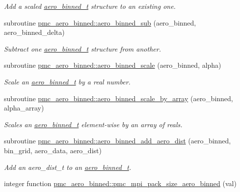 \begin{DoxyCompactItemize}
\begin{DoxyCompactList}\small\item\em Add a scaled {\ttfamily \mbox{\hyperlink{structpmc__aero__binned_1_1aero__binned__t}{aero\+\_\+binned\+\_\+t}}} structure to an existing one. \end{DoxyCompactList}\item 
subroutine \mbox{\hyperlink{namespacepmc__aero__binned_a951d4b411ac6e8389dff498a3fac4a75}{pmc\+\_\+aero\+\_\+binned\+::aero\+\_\+binned\+\_\+sub}} (aero\+\_\+binned, aero\+\_\+binned\+\_\+delta)
\begin{DoxyCompactList}\small\item\em Subtract one \mbox{\hyperlink{structpmc__aero__binned_1_1aero__binned__t}{aero\+\_\+binned\+\_\+t}} structure from another. \end{DoxyCompactList}\item 
subroutine \mbox{\hyperlink{namespacepmc__aero__binned_aaad30ea5e8fa124ae11804528f398bf0}{pmc\+\_\+aero\+\_\+binned\+::aero\+\_\+binned\+\_\+scale}} (aero\+\_\+binned, alpha)
\begin{DoxyCompactList}\small\item\em Scale an \mbox{\hyperlink{structpmc__aero__binned_1_1aero__binned__t}{aero\+\_\+binned\+\_\+t}} by a real number. \end{DoxyCompactList}\item 
subroutine \mbox{\hyperlink{namespacepmc__aero__binned_a6919807c13cf69e9475e0a025b11d246}{pmc\+\_\+aero\+\_\+binned\+::aero\+\_\+binned\+\_\+scale\+\_\+by\+\_\+array}} (aero\+\_\+binned, alpha\+\_\+array)
\begin{DoxyCompactList}\small\item\em Scales an \mbox{\hyperlink{structpmc__aero__binned_1_1aero__binned__t}{aero\+\_\+binned\+\_\+t}} element-\/wise by an array of reals. \end{DoxyCompactList}\item 
subroutine \mbox{\hyperlink{namespacepmc__aero__binned_a9de5c0ee7ae2e44a03b162692d83c1f7}{pmc\+\_\+aero\+\_\+binned\+::aero\+\_\+binned\+\_\+add\+\_\+aero\+\_\+dist}} (aero\+\_\+binned, bin\+\_\+grid, aero\+\_\+data, aero\+\_\+dist)
\begin{DoxyCompactList}\small\item\em Add an aero\+\_\+dist\+\_\+t to an \mbox{\hyperlink{structpmc__aero__binned_1_1aero__binned__t}{aero\+\_\+binned\+\_\+t}}. \end{DoxyCompactList}\item 
integer function \mbox{\hyperlink{namespacepmc__aero__binned_a176eeff6d4f514d3e2021821bcaa166e}{pmc\+\_\+aero\+\_\+binned\+::pmc\+\_\+mpi\+\_\+pack\+\_\+size\+\_\+aero\+\_\+binned}} (val)

\end{DoxyCompactItemize}
